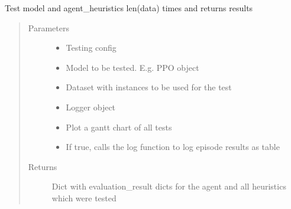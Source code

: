 \documentclass[letterpaper,10pt,english]{sphinxmanual}
\begin{document}
\begin{fulllineitems}
\label{\detokenize{agents.reinforcement_learning:agents.test.test_model_and_heuristic}}
\sphinxAtStartPar
Test model and agent\_heuristics len(data) times and returns results
\begin{quote}\begin{description}
\item[{Parameters}] \leavevmode\begin{itemize}
\item {} 
\sphinxAtStartPar
{} \textendash{} Testing config

\item {} 
\sphinxAtStartPar
{} \textendash{} Model to be tested. E.g. PPO object

\item {} 
\sphinxAtStartPar
{} \textendash{} Dataset with instances to be used for the test

\item {} 
\sphinxAtStartPar
{} \textendash{} Logger object

\item {} 
\sphinxAtStartPar
{} \textendash{} Plot a gantt chart of all tests

\item {} 
\sphinxAtStartPar
{} \textendash{} If true, calls the log function to log episode results as table

\end{itemize}

\item[{Returns}] \leavevmode
\sphinxAtStartPar
Dict with evaluation\_result dicts for the agent and all heuristics which were tested

\end{description}\end{quote}

\end{fulllineitems}
\end{document}

